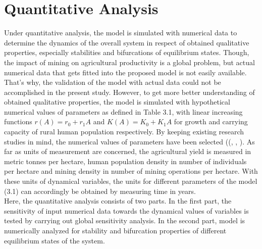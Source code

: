 \documentclass[12pt,a4wide]{report}
\numberwithin{equation}{chapter}
\numberwithin{theorem}{chapter}
\begin{document}
\section{Quantitative Analysis}
Under quantitative analysis, the model is simulated with numerical data to determine the dynamics of the overall system in respect of obtained qualitative properties, especially stabilities and bifurcations of equilibrium states. Though, the impact of mining on agricultural productivity is a global problem, but actual numerical data that gets fitted into the proposed model is not easily available. That's why, the validation of the model with actual data could not be accomplished in the present study. However, to get more better understanding of obtained qualitative properties, the model is simulated with hypothetical numerical values of parameters as defined in Table 3.1, with linear increasing functions $r(A)=r_0+r_1 A$ and $K(A)=K_0+K_1 A$ for growth and carrying capacity of rural human population respectively. By keeping existing research studies in mind, the numerical values of parameters have been selected ((\cite{verma2018effects}, \cite{jyotsna2017nrm}, \cite{jyotsna2017jbs}). As far as units of measurement are concerned, the agricultural yield is measured in metric tonnes per hectare, human population density in number of individuals per hectare and mining density in number of mining operations per hectare. With these units of dynamical variables, the units for different parameters of the model (3.1) can accordingly be obtained by measuring time in years.\\
Here, the quantitative analysis consists of two parts. In the first part, the sensitivity of input numerical data towards the dynamical values of variables is tested by carrying out global sensitivity analysis. In the second part, model is numerically analyzed for stability and bifurcation properties of different equilibrium states of the system.
\end{document}
